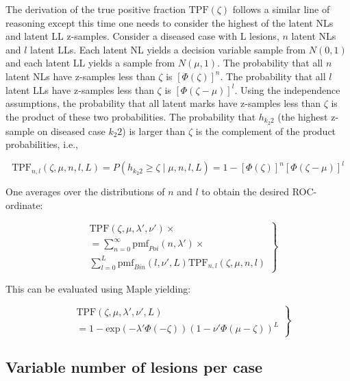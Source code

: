 \documentclass[
]{book}
\begin{document}
The derivation of the true positive fraction \(\text{TPF}(\zeta)\) follows a similar line of reasoning except this time one needs to consider the highest of the latent NLs and latent LL z-samples. Consider a diseased case with L lesions, \(n\) latent NLs and \(l\) latent LLs. Each latent NL yields a decision variable sample from \(N(0,1)\) and each latent LL yields a sample from \(N(\mu,1)\). The probability that all \(n\) latent NLs have z-samples less than \(\zeta\) is \([\Phi(\zeta)]^n\). The probability that all \(l\) latent LLs have z-samples less than \(\zeta\) is \([\Phi(\zeta - \mu)]^l\). Using the independence assumptions, the probability that all latent marks have z-samples less than \(\zeta\) is the product of these two probabilities. The probability that \(h_{k_2 2}\) (the highest z-sample on diseased case \(k_2 2\)) is larger than \(\zeta\) is the complement of the product probabilities, i.e.,

\[\text{TPF}_{n,l}\left ( \zeta, \mu, n, l, L \right ) = P\left ( h_{k_2 2} \geq \zeta \mid \mu, n, l, L \right ) = 1 - \left [ \Phi\left ( \zeta \right ) \right ]^n \left [ \Phi\left ( \zeta - \mu\right ) \right ]^l\]

One averages over the distributions of \(n\) and \(l\) to obtain the desired ROC-ordinate:

\begin{equation}
\left.
\begin{aligned}
& \text{TPF}\left ( \zeta, \mu, \lambda', \nu' \right ) \times \\
&= \sum_{n=0}^{\infty} \text{pmf}_{Poi}(n,\lambda') \times \\
& \sum_{l=0}^{L} \text{pmf}_{Bin}(l,\nu',L) \text{TPF}_{n,l}\left ( \zeta, \mu, n, l \right )
\end{aligned}
\right \}
\label{eq:rsm-pred-tpf-varyl}
\end{equation}

This can be evaluated using Maple yielding:

\begin{equation}
\left.
\begin{aligned}
& \text{TPF}\left (\zeta , \mu, \lambda', \nu', L \right ) \\
&= 1 - \text{exp}\left ( - \lambda' \Phi \left ( - \zeta \right )\right )
\left ( 1 - \nu' \Phi \left ( \mu - \zeta \right ) \right )^L
\end{aligned}
\right \}
\label{eq:rsm-pred-tpf-l}
\end{equation}

\hypertarget{rsm-pred-tpf-varying-lesions}{%
\subsection{Variable number of lesions per case}\label{rsm-pred-tpf-varying-lesions}}
\end{document}
